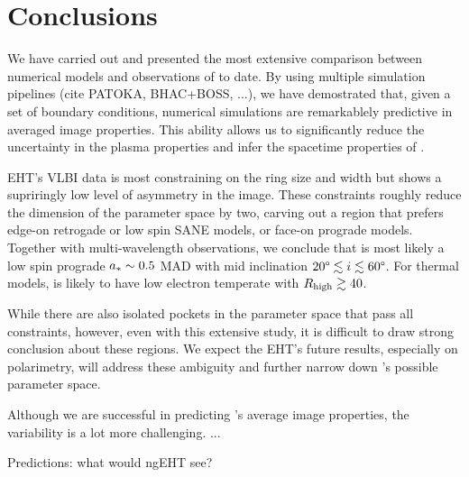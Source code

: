 \section{Conclusions}\label{sec:conclusions}


We have carried out and presented the most extensive comparison
between numerical models and observations of \sgra to date.
By using multiple simulation pipelines (cite PATOKA, BHAC+BOSS, ...),
we have demostrated that, given a set of boundary conditions,
numerical simulations are remarkablely predictive in averaged image
properties.
This ability allows us to significantly reduce the uncertainty in the
plasma properties and infer the spacetime properties of \sgra.

EHT's VLBI data is most constraining on the ring size and width but
shows a supriringly low level of asymmetry in the image.
These constraints roughly reduce the dimension of the parameter space
by two, carving out a region that prefers edge-on retrogade or low
spin SANE models, or face-on prograde models.
Together with multi-wavelength observations, we conclude that \sgra is
most likely a low spin prograde $a_* \sim 0.5$ MAD with mid
inclination $20\degree \lesssim i \lesssim 60\degree$.
For thermal models, \sgra is likely to have low electron temperate
with $R_\mathrm{high} \gtrsim 40$.

While there are also isolated pockets in the parameter space that pass
all constraints, however, even with this extensive study, it is
difficult to draw strong conclusion about these regions.
We expect the EHT's future results, especially on polarimetry, will
address these ambiguity and further narrow down \sgra's possible parameter
space.

Although we are successful in predicting \sgra's average image
properties, the variability is a lot more challenging.
...

Predictions: what would ngEHT see?
